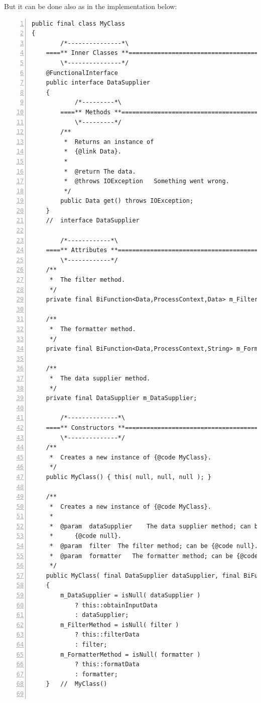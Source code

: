 \documentclass[11pt,a4paper, titlepage, parskip=half, headsepline, footsepline, cleardoublepage=current, headheight=1cm]{scrbook}
\begin{document}
But it can be done also as in the implementation below:
\begin{lstlisting}[numbers=left]
public final class MyClass
{
        /*---------------*\
    ====** Inner Classes **==========================================
        \*---------------*/
    @FunctionalInterface
    public interface DataSupplier
    {
            /*---------*\
        ====** Methods **============================================
            \*---------*/
        /**
         *  Returns an instance of
         *  {@link Data}.
         *
         *  @return The data.
         *  @throws IOException   Something went wrong.
         */
        public Data get() throws IOException;
    }
    //  interface DataSupplier

        /*------------*\
    ====** Attributes **=============================================
        \*------------*/
    /**
     *  The filter method.
     */
    private final BiFunction<Data,ProcessContext,Data> m_FilterMethod;

    /**
     *  The formatter method.
     */
    private final BiFunction<Data,ProcessContext,String> m_FormatterMethod;

    /**
     *  The data supplier method.
     */
    private final DataSupplier m_DataSupplier;

        /*--------------*\
    ====** Constructors **===========================================
        \*--------------*/
    /**
     *  Creates a new instance of {@code MyClass}.
     */
    public MyClass() { this( null, null, null ); }

    /**
     *  Creates a new instance of {@code MyClass}.
     *
     *  @param  dataSupplier    The data supplier method; can be 
     *      {@code null}.
     *  @param  filter  The filter method; can be {@code null}.
     *  @param  formatter   The formatter method; can be {@code null}.
     */
    public MyClass( final DataSupplier dataSupplier, final BiFunction<Data,ProcessContext,Data> filter, final BiFunction<Data,ProcessContext,String> formatter )
    {
        m_DataSupplier = isNull( dataSupplier ) 
            ? this::obtainInputData 
            : dataSupplier;
        m_FilterMethod = isNull( filter ) 
            ? this::filterData 
            : filter;
        m_FormatterMethod = isNull( formatter ) 
            ? this::formatData 
            : formatter;
    }   //  MyClass()


\end{lstlisting}
\end{document}
